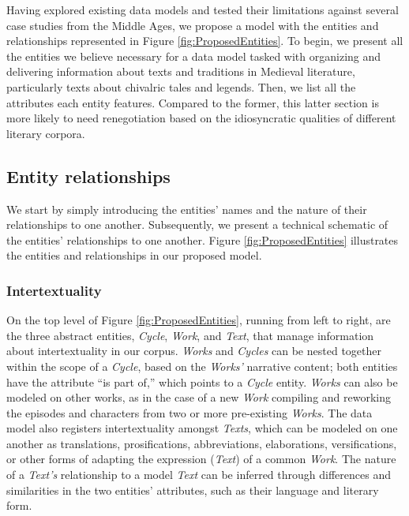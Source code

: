 Having explored existing data models and tested their limitations against several case studies from the Middle Ages, we propose a model with the entities and relationships represented in Figure \ref{fig:ProposedEntities}. To begin, we present all the entities we believe necessary for a data model tasked with organizing and delivering information about texts and traditions in Medieval literature, particularly texts about chivalric tales and legends. Then, we list all the attributes each entity features. Compared to the former, this latter section is more likely to need renegotiation based on the idiosyncratic qualities of different literary corpora.

\subsection{Entity relationships}

We start by simply introducing the entities' names and the nature of their relationships to one another. Subsequently, we present a technical schematic of the entities' relationships to one another. Figure \ref{fig:ProposedEntities} illustrates the entities and relationships in our proposed model.

\subsubsection{Intertextuality}

On the top level of Figure \ref{fig:ProposedEntities}, running from left to right, are the three abstract entities, \textit{Cycle}, \textit{Work}, and \textit{Text}, that manage information about intertextuality in our corpus. \textit{Works} and \textit{Cycles} can be nested together within the scope of a \textit{Cycle}, based on the \textit{Works'} narrative content; both entities have the attribute ``is part of,'' which points to a \textit{Cycle} entity. \textit{Works} can also be modeled on other works, as in the case of a new \textit{Work} compiling and reworking the episodes and characters from two or more pre-existing \textit{Works}. The data model also registers intertextuality amongst \textit{Texts}, which can be modeled on one another as translations, prosifications, abbreviations, elaborations, versifications, or other forms of adapting the expression (\textit{Text}) of a common \textit{Work}. The nature of a \textit{Text's} relationship to a model \textit{Text} can be inferred through differences and similarities in the two entities' attributes, such as their language and literary form.

